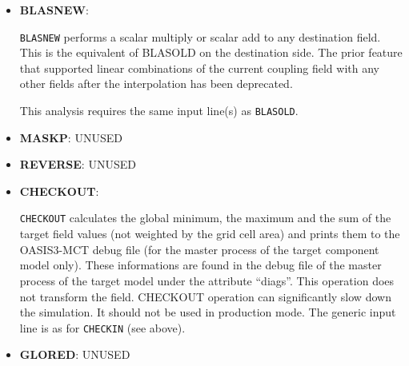 \begin{itemize}
%
%

\item {\bf BLASNEW}:
 
  {\tt BLASNEW} performs a scalar multiply or scalar add to any
  destination field.  This is the equivalent of BLASOLD on the
  destination side.  The prior feature that supported linear
  combinations of the current coupling field with any other fields
  after the interpolation has been deprecated.

  This analysis requires the same input line(s) as {\tt BLASOLD}.

\item {\bf MASKP}: UNUSED

\item {\bf REVERSE}: UNUSED

\item {\bf CHECKOUT}:

  {\tt CHECKOUT} calculates the global minimum, the maximum and the
  sum of the target field values (not weighted by the grid cell area)
  and prints them to the OASIS3-MCT debug file (for the master process
  of the target component model only). These informations are found in 
  the debug file of the master process of the target model under the 
  attribute ``diags''. This operation does not
  transform the field. CHECKOUT operation can significantly slow down the simulation.
  It should not be used in production mode.
  The generic input line is as for {\tt CHECKIN} (see above).

\item {\bf GLORED}: UNUSED

\end{itemize}


